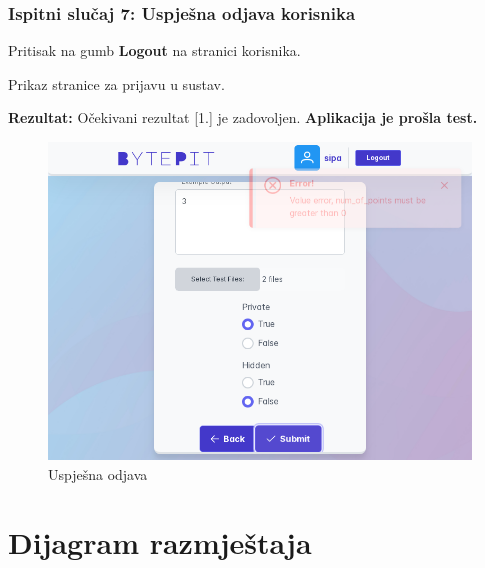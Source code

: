 			\subsubsection{Ispitni slučaj 7: Uspješna odjava korisnika}
			
			
			\begin{packed_enum}
				
				\item  Pritisak na gumb \textbf{Logout} na stranici korisnika.
				
			\end{packed_enum}
			
			\begin{packed_enum}
				
				\item  Prikaz stranice za prijavu u sustav.
				
			\end{packed_enum}
			
			\noindent \textbf{Rezultat:} Očekivani rezultat [1.] je zadovoljen. \textbf{Aplikacija je prošla test.}
			
			\begin{figure}[H]
				\includegraphics[scale=0.38]{slike/create_problem_test_wrong.PNG}
				\centering
				\caption{Uspješna odjava}
				\label{fig:sucess_logout}
			\end{figure}
			
			
			\eject 
		
		
		\section{Dijagram razmještaja}

